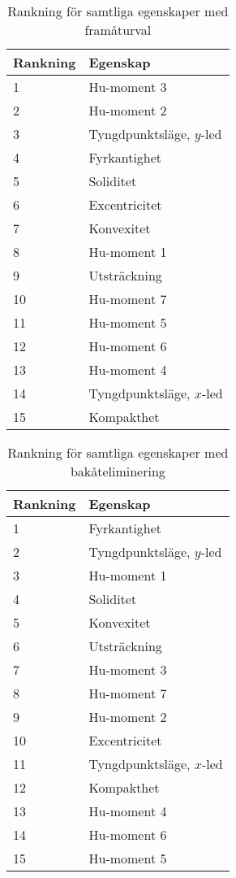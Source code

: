 \documentclass[../rapport_MVEX01-11-05]{subfiles}
\begin{document}
\vspace{-3.75\bigskipamount}
\begin{table}[h]
	\centering
	\caption{Rankning för samtliga egenskaper med framåturval}
\small	
	\label{tab:bestfeatsfwd}
	\begin{tabular}{ll}
		\toprule
		Rankning & Egenskap \\
		\midrule
		1 & Hu-moment 3 \\
		2 & Hu-moment 2 \\
		3 & Tyngdpunktsläge, $y$-led \\
		4 & Fyrkantighet \\
		5 & Soliditet \\
		6 & Excentricitet \\
		7 & Konvexitet \\
		8 & Hu-moment 1 \\
                9 & Utsträckning \\
                10 & Hu-moment 7 \\
                11 & Hu-moment 5 \\
                12 & Hu-moment 6 \\
                13 & Hu-moment 4 \\
                14 & Tyngdpunktsläge, $x$-led \\
                15 & Kompakthet\\
		\bottomrule
	\end{tabular}
\end{table}
\vspace{-1.25\bigskipamount}
\begin{table}[h]
	\centering
	\caption{Rankning för samtliga egenskaper med bakåteliminering}
\small	
	\label{tab:featsbwd}
	\begin{tabular}{ll}
		\toprule
		Rankning & Egenskap \\
		\midrule
                1 & Fyrkantighet \\
                2 & Tyngdpunktsläge, $y$-led \\
                3 & Hu-moment 1\\
                4 & Soliditet\\
                5 & Konvexitet \\
                6 & Utsträckning \\
                7 & Hu-moment 3 \\
                8 & Hu-moment 7 \\
                9 & Hu-moment 2 \\
                10 & Excentricitet \\
                11 & Tyngdpunktsläge, $x$-led \\
                12 & Kompakthet \\
                13 & Hu-moment 4 \\
                14 & Hu-moment 6 \\
                15 & Hu-moment 5 \\
		\bottomrule
	\end{tabular}
	\vspace{-4\bigskipamount}

\end{table}
\end{document}
